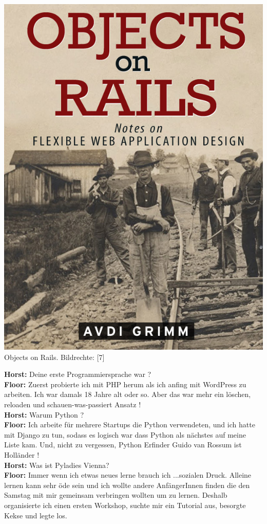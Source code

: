 \begin{center}
\includegraphics[width=\linewidth]{floor/floor-rails.jpg} \\
\footnotesize{Objects on Rails. Bildrechte: [7]} 
\end{center}
\textbf{Horst:} Deine erste Programmiersprache war ? \\
\textbf{Floor:} Zuerst probierte ich mit PHP herum als ich anfing mit WordPress zu arbeiten. Ich war damals 18 Jahre alt oder so. Aber das war mehr ein löschen, reloaden und schauen-was-passiert Ansatz ! \\
\textbf{Horst:} Warum Python ? \\
\textbf{Floor:} Ich arbeite für mehrere Startups die Python verwendeten, und ich hatte mit Django zu tun, sodass es logisch war dass Python als nächstes auf meine Liste kam. Und, nicht zu vergessen, Python Erfinder Guido van Rossum ist Holländer ! \\
\textbf{Horst:} Was ist Pyladies Vienna? \\
\textbf{Floor:} Immer wenn ich etwas neues lerne brauch ich ...sozialen Druck. Alleine lernen kann sehr öde sein und ich wollte andere AnfängerInnen finden die den Samstag mit mir gemeinsam verbringen wollten um zu lernen. Deshalb organisierte ich einen ersten Workshop, suchte mir ein Tutorial aus, besorgte Kekse und legte los.

